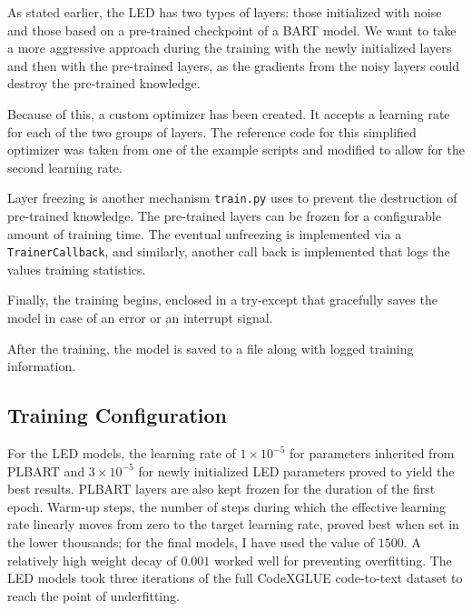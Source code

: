         As stated earlier, the LED has two types of layers: those initialized with noise and those based on a pre-trained checkpoint of a BART model. We want to take a more aggressive approach during the training with the newly initialized layers and then with the pre-trained layers, as the gradients from the noisy layers could destroy the pre-trained knowledge.
        
        Because of this, a custom optimizer has been created. It accepts a learning rate for each of the two groups of layers. The reference code for this simplified optimizer was taken from one of the example scripts and modified to allow for the second learning rate.
        
        Layer freezing is another mechanism \texttt{train.py} uses to prevent the destruction of pre-trained knowledge. The pre-trained layers can be frozen for a configurable amount of training time. The eventual unfreezing is implemented via a \texttt{TrainerCallback}, and similarly, another call back is implemented that logs the values training statistics.
        
        Finally, the training begins, enclosed in a try-except that gracefully saves the model in case of an error or an interrupt signal.
        
        After the training, the model is saved to a file along with logged training information.

        \subsection{Training Configuration}

        For the LED models, the learning rate of $1 \times 10^{-5}$ for parameters inherited from PLBART and $3 \times 10^{-5}$ for newly initialized LED parameters proved to yield the best results. PLBART layers are also kept frozen for the duration of the first epoch. Warm-up steps, the number of steps during which the effective learning rate linearly moves from zero to the target learning rate, proved best when set in the lower thousands; for the final models, I have used the value of $1500$. A relatively high weight decay of $0.001$ worked well for preventing overfitting. The LED models took three iterations of the full CodeXGLUE code-to-text dataset to reach the point of underfitting.


